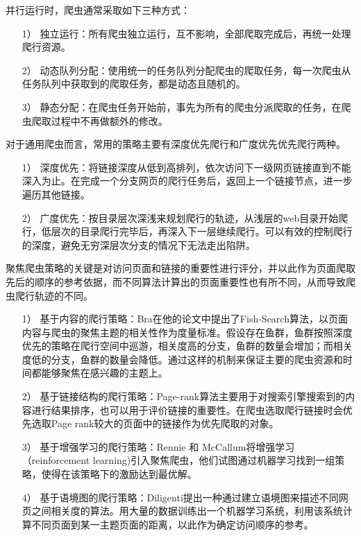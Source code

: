 \documentclass[doctor,privacy,twoside]{buaa_mac}
\begin{document}
并行运行时，爬虫通常采取如下三种方式：
\begin{itemize}
\item[1）] 独立运行：所有爬虫独立运行，互不影响，全部爬取完成后，再统一处理爬行资源。
\item[2）] 动态队列分配：使用统一的任务队列分配爬虫的爬取任务，每一次爬虫从任务队列中获取到的爬取任务，都是动态且随机的。
\item[3）] 静态分配：在爬虫任务开始前，事先为所有的爬虫分派爬取的任务，在爬虫爬取过程中不再做额外的修改。
\end{itemize}

对于通用爬虫而言，常用的策略主要有深度优先爬行和广度优先优先爬行两种。
\begin{itemize}
\item[1）] 深度优先：将链接深度从低到高排列，依次访问下一级网页链接直到不能深入为止。在完成一个分支网页的爬行任务后，返回上一个链接节点，进一步遍历其他链接。
\item[2）] 广度优先：按目录层次深浅来规划爬行的轨迹，从浅层的web目录开始爬行，低层次的目录爬行完毕后，再深入下一层继续爬行。可以有效的控制爬行的深度，避免无穷深层次分支的情况下无法走出陷阱。
\end{itemize}

聚焦爬虫策略的关键是对访问页面和链接的重要性进行评分，并以此作为页面爬取先后的顺序的参考依据，而不同算法计算出的页面重要性也有所不同，从而导致爬虫爬行轨迹的不同。

\begin{itemize}
\item[1）] 基于内容的爬行策略：Bra在他的论文中提出了Fish-Search算法，以页面内容与爬虫的聚焦主题的相关性作为度量标准。假设存在鱼群，鱼群按照深度优先的策略在爬行空间中巡游，相关度高的分支，鱼群的数量会增加；而相关度低的分支，鱼群的数量会降低。通过这样的机制来保证主要的爬虫资源和时间都能够聚焦在感兴趣的主题上。 
\item[2）] 基于链接结构的爬行策略：Page-rank算法主要用于对搜索引擎搜索到的内容进行结果排序，也可以用于评价链接的重要性。在爬虫选取爬行链接时会优先选取Page rank较大的页面中的链接作为优先爬取的对象。
\item[3）] 基于增强学习的爬行策略：Rennie 和 McCallum将增强学习（reinforcement learning)引入聚焦爬虫，他们试图通过机器学习找到一组策略，使得在该策略下的激励达到最优解。
\item[4）] 基于语境图的爬行策略：Diligenti提出一种通过建立语境图来描述不同网页之间相关度的算法。用大量的数据训练出一个机器学习系统，利用该系统计算不同页面到某一主题页面的距离，以此作为确定访问顺序的参考。
\end{itemize}
\end{document}
